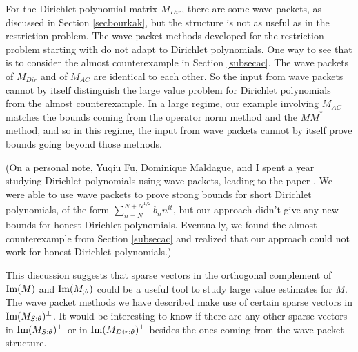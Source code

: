 \documentclass{amsart}
\begin{document}
For the Dirichlet polynomial matrix $M_{Dir}$, there are some wave packets, as discussed in Section \ref{secbourkak}, but the structure is not as useful as in the restriction problem.  The wave packet methods developed for the restriction problem starting with  \cite{B3} do not adapt to Dirichlet polynomials.  One way to see that is to consider the almost counterexample in Section \ref{subsecac}.  The wave packets of $M_{Dir}$ and of $M_{AC}$ are identical to each other.  So the input from wave packets cannot by itself distinguish the large value problem for Dirichlet polynomials from the almost counterexample.  In a large regime, our example involving $M_{AC}$ matches the bounds coming from the operator norm method and the $MM^*$ method, and so in this regime, the input from wave packets cannot by itself prove bounds going beyond those methods.  

(On a personal note, Yuqiu Fu, Dominique Maldague, and I spent a year studying Dirichlet polynomials using wave packets, leading to the paper \cite{FGM}.  We were able to use wave packets to prove strong bounds for short Dirichlet polynomials, of the form $\sum_{n = N}^{N + N^{1/2}} b_n n^{it}$, but our approach didn't give any new bounds for honest Dirichlet polynomials.  
Eventually, we found the almost counterexample from Section \ref{subsecac} and realized that our approach could not work for honest Dirichlet polynomials.)


This discussion suggests that sparse vectors in the orthogonal complement of $\textrm{Im}(M)$ and $\textrm{Im}( M_{;\theta})$ could be a useful tool to study large value estimates for $M$.  The wave packet methods we have described make use of certain sparse vectors in $\textrm{Im}(M_{S; \theta})^\perp$.  It would be interesting to know if there are any other sparse vectors in $\textrm{Im}(M_{S; \theta})^\perp$ or in $\textrm{Im}(M_{Dir; \theta})^\perp$ besides the ones coming from the wave packet structure.
\end{document}
